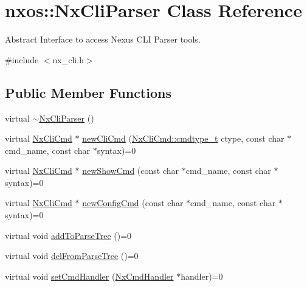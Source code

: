 \hypertarget{classnxos_1_1_nx_cli_parser}{}\section{nxos\+:\+:Nx\+Cli\+Parser Class Reference}
\label{classnxos_1_1_nx_cli_parser}


Abstract Interface to access Nexus C\+LI Parser tools.  




{\ttfamily \#include $<$nx\+\_\+cli.\+h$>$}

\subsection*{Public Member Functions}
\begin{DoxyCompactItemize}
\item 
virtual \mbox{\hyperlink{classnxos_1_1_nx_cli_parser_ae7d5ada6ff25efd19ba95161fa60eeac}{$\sim$\+Nx\+Cli\+Parser}} ()
\item 
virtual \mbox{\hyperlink{classnxos_1_1_nx_cli_cmd}{Nx\+Cli\+Cmd}} $\ast$ \mbox{\hyperlink{classnxos_1_1_nx_cli_parser_a210cbbb8b312093285741f753c4cdcda}{new\+Cli\+Cmd}} (\mbox{\hyperlink{classnxos_1_1_nx_cli_cmd_a82ed104f13c7859b24d3c0527f706be1}{Nx\+Cli\+Cmd\+::cmdtype\+\_\+t}} ctype, const char $\ast$cmd\+\_\+name, const char $\ast$syntax)=0
\item 
virtual \mbox{\hyperlink{classnxos_1_1_nx_cli_cmd}{Nx\+Cli\+Cmd}} $\ast$ \mbox{\hyperlink{classnxos_1_1_nx_cli_parser_ac07fa22d7d83d4c9015ea1f3976163d8}{new\+Show\+Cmd}} (const char $\ast$cmd\+\_\+name, const char $\ast$syntax)=0
\item 
virtual \mbox{\hyperlink{classnxos_1_1_nx_cli_cmd}{Nx\+Cli\+Cmd}} $\ast$ \mbox{\hyperlink{classnxos_1_1_nx_cli_parser_a51481c851ccf87288513ba73e0380895}{new\+Config\+Cmd}} (const char $\ast$cmd\+\_\+name, const char $\ast$syntax)=0
\item 
virtual void \mbox{\hyperlink{classnxos_1_1_nx_cli_parser_a3c5295a4b2de3068d1653a6c303a22ee}{add\+To\+Parse\+Tree}} ()=0
\item 
virtual void \mbox{\hyperlink{classnxos_1_1_nx_cli_parser_a169976099ecf7a05277bfc72259ff1bc}{del\+From\+Parse\+Tree}} ()=0
\item 
virtual void \mbox{\hyperlink{classnxos_1_1_nx_cli_parser_a711e36619a40625ebf62b59693529d88}{set\+Cmd\+Handler}} (\mbox{\hyperlink{classnxos_1_1_nx_cmd_handler}{Nx\+Cmd\+Handler}} $\ast$handler)=0
\item 

\end{DoxyCompactItemize}
